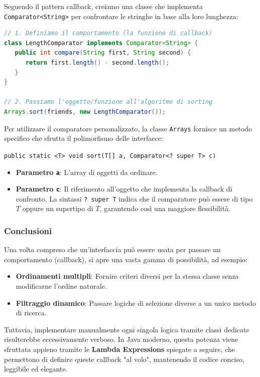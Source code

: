 \vspace{\baselineskip}

Seguendo il pattern callback, creiamo una classe che implementa \texttt{Comparator<String>} per confrontare le stringhe in base alla loro lunghezza:

\begin{lstlisting}[language=Java, caption={Comparator come "pacchetto" di una funzione di confronto}]
// 1. Definiamo il comportamento (la funzione di callback)
class LengthComparator implements Comparator<String> {
   public int compare(String first, String second) {
      return first.length() - second.length();
   }
}

// 2. Passiamo l'oggetto/funzione all'algoritmo di sorting
Arrays.sort(friends, new LengthComparator());
\end{lstlisting}

Per utilizzare il comparatore personalizzato, la classe \texttt{Arrays} fornisce un metodo specifico che sfrutta il polimorfismo delle interfacce:

\begin{center}
    \label{firma Array.sort}
    \texttt{public static <T> void sort(T[] a, Comparator<? super T> c)}
\end{center}

\begin{itemize}
    \item \textbf{Parametro \texttt{a}}: L'array di oggetti da ordinare.
    \item \textbf{Parametro \texttt{c}}: Il riferimento all'oggetto che implementa la callback di confronto. La sintassi \texttt{? super T} indica che il comparatore può essere di tipo $T$ oppure un supertipo di $T$, garantendo così una maggiore flessibilità.
\end{itemize}

\subsubsection*{Conclusioni}
Una volta compreso che un'interfaccia può essere usata per passare un comportamento (callback), si apre una vasta gamma di possibilità, ad esempio:
\begin{itemize}
    \item \textbf{Ordinamenti multipli}: Fornire criteri diversi per la stessa classe senza modificarne l'ordine naturale.
    \item \textbf{Filtraggio dinamico}: Passare logiche di selezione diverse a un unico metodo di ricerca.
\end{itemize}
Tuttavia, implementare manualmente ogni singola logica tramite classi dedicate risulterebbe eccessivamente verboso. In Java moderno, questa potenza viene sfruttata appieno tramite le \textbf{Lambda Expressions} spiegate a seguire, che permettono di definire queste callback "al volo", mantenendo il codice conciso, leggibile ed elegante.

